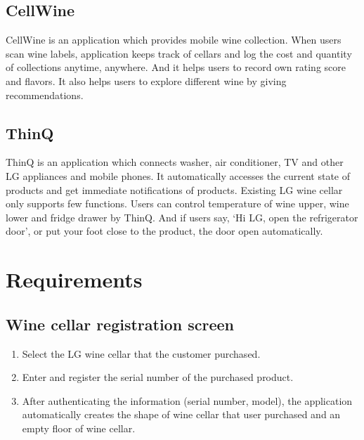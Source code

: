 \documentclass[conference]{IEEEtran}
\numberwithin{figure}{subsection}
\begin{document}
\subsection{CellWine}
CellWine is an application which provides mobile wine collection. When users scan wine labels, application keeps track of cellars and log the cost and quantity of collections anytime, anywhere. And it helps users to record own rating score and flavors. It also helps users to explore different wine by giving recommendations. 

\subsection{ThinQ}
ThinQ is an application which connects washer, air conditioner, TV and other LG appliances and mobile phones. It automatically accesses the current state of products and get immediate notifications of products. Existing LG wine cellar only supports few functions. Users can control temperature of wine upper, wine lower and fridge drawer by ThinQ. And if users say, ‘Hi LG, open the refrigerator door’, or put your foot close to the product, the door open automatically.

\section{Requirements}
\subsection {\textbf{Wine cellar registration screen}}
\begin{enumerate}
\item Select the LG wine cellar that the customer purchased.
\item Enter and register the serial number of the purchased product.
\item After authenticating the information (serial number, model), the application automatically creates the shape of wine cellar that user purchased and an empty floor of wine cellar.
\end{enumerate}
\end{document}
